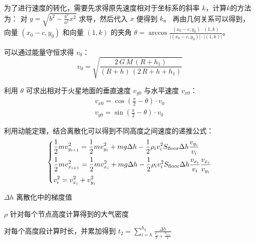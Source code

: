 \documentclass[hyperref,a4paper,UTF8]{ctexart}
\begin{document}
为了进行速度的转化，需要先求得原先速度相对于坐标系的斜率 $k$，计算$k$的方法为：
对 $y = \sqrt{b^2 - \frac{b^2}{a^2}x^2}$ 求导，然后代入 $x$ 便得到 $k$。
再由几何关系可以得到，向量 $(x_0 - c, y_0)$ \smallskip 和向量 $(1,k)$ 的夹角 $\theta = \arccos
    \frac{\displaystyle (x_0 - c, y_0)·(1,k)}{\displaystyle\vert (x_0 - c, y_0)\vert \cdot |(1,k)|} $。

\smallskip
可以通过能量守恒求得 $v_0$：
\[
    v_0 = \sqrt{\frac{2\,G\,M\,{\left(R+h_1 \right)}}
        {{\left(R+h\right)}\,{\left(2\,R+h+h_1 \right)}}}
\]

利用 $\theta $ 可求出相对于火星地面的垂直速度 $v_{y0}$ 与水平速度 $v_{x0}$：
\begin{gather*}
    v_{x0} = \cos (\frac{\pi }{2} - \theta ) \cdot v_0 \\
    v_{y0} = \sin (\frac{\pi }{2} - \theta ) \cdot v_0
\end{gather*}

利用动能定理，结合离散化可以得到不同高度之间速度的递推公式：
\[
    \begin{dcases}
        \frac{1}{2}mv_{y_{i + 1}}^2 = \frac{1}{2}mv_{y_{i}}^2 + mg\Delta h -
        \frac{1}{2}\rho _iv_i^2S_{\text{floor}}\Delta h\frac{v_{y_i}}{v_i}                        \\
        \frac{1}{2}mv_{x_{i + 1}}^2 = \frac{1}{2}mv_{x_{i}}^2 + mg\Delta h -
        \frac{1}{2}\rho _iv_i^2S_{\text{floor}}\Delta h\frac{v_{x_i}}{v_i}\frac{v_{x_i}}{v_{y_i}} \\
        v_i^2 = v_{x_i}^2 + v_{y_i}^2
    \end{dcases}
\]
\begin{eqexpl}[0mm]
    \item{$\Delta h$} 离散化中的梯度值
    \item{$\rho$} 针对每个节点高度计算得到的大气密度
\end{eqexpl}
\smallskip

对每个高度段计算时长，并累加得到
$
    \displaystyle t_2=\sum_{i=h}^{h_3}{\displaystyle\frac{\Delta h}{\frac{\displaystyle v_i}
        {\displaystyle 2}+\frac{\displaystyle v_{\textrm{i+1}} }{\displaystyle 2}}}
$
\end{document}
